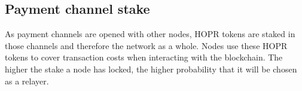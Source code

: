 \subsection{Payment channel stake}

As payment channels are opened with other nodes, HOPR tokens are staked in those channels and therefore the network as a whole. Nodes use these HOPR
tokens to cover transaction costs when interacting with the blockchain. The higher
the stake a node has locked, the higher probability that it will be chosen as a relayer.
